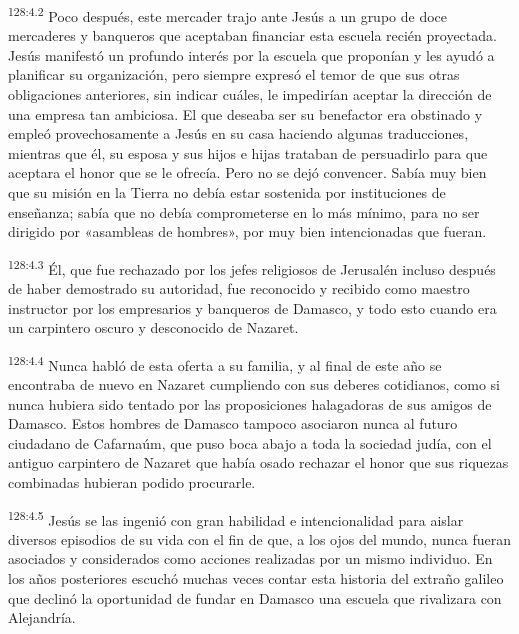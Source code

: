 \par 
\textsuperscript{128:4.2} Poco después, este mercader trajo ante Jesús a un grupo de doce mercaderes y banqueros que aceptaban financiar esta escuela recién proyectada. Jesús manifestó un profundo interés por la escuela que proponían y les ayudó a planificar su organización, pero siempre expresó el temor de que sus otras obligaciones anteriores, sin indicar cuáles, le impedirían aceptar la dirección de una empresa tan ambiciosa. El que deseaba ser su benefactor era obstinado y empleó provechosamente a Jesús en su casa haciendo algunas traducciones, mientras que él, su esposa y sus hijos e hijas trataban de persuadirlo para que aceptara el honor que se le ofrecía. Pero no se dejó convencer. Sabía muy bien que su misión en la Tierra no debía estar sostenida por instituciones de enseñanza; sabía que no debía comprometerse en lo más mínimo, para no ser dirigido por «asambleas de hombres», por muy bien intencionadas que fueran.

\par 
\textsuperscript{128:4.3} Él, que fue rechazado por los jefes religiosos de Jerusalén incluso después de haber demostrado su autoridad, fue reconocido y recibido como maestro instructor por los empresarios y banqueros de Damasco, y todo esto cuando era un carpintero oscuro y desconocido de Nazaret.

\par 
\textsuperscript{128:4.4} Nunca habló de esta oferta a su familia, y al final de este año se encontraba de nuevo en Nazaret cumpliendo con sus deberes cotidianos, como si nunca hubiera sido tentado por las proposiciones halagadoras de sus amigos de Damasco. Estos hombres de Damasco tampoco asociaron nunca al futuro ciudadano de Cafarnaúm, que puso boca abajo a toda la sociedad judía, con el antiguo carpintero de Nazaret que había osado rechazar el honor que sus riquezas combinadas hubieran podido procurarle.

\par 
\textsuperscript{128:4.5} Jesús se las ingenió con gran habilidad e intencionalidad para aislar diversos episodios de su vida con el fin de que, a los ojos del mundo, nunca fueran asociados y considerados como acciones realizadas por un mismo individuo. En los años posteriores escuchó muchas veces contar esta historia del extraño galileo que declinó la oportunidad de fundar en Damasco una escuela que rivalizara con Alejandría.

